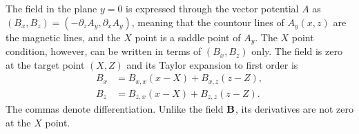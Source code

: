 \documentclass[10pt]{article}
\newcommand{\bfB}{{\bf B}}
\begin{document}
The field in the plane $y=0$ is expressed through the vector potential
$A$ as $(B_x, B_z) = (-\partial_zA_y, \partial_xA_y)$, meaning that
the countour lines of $A_y(x, z)$ are the magnetic lines, and the $X$
point is a saddle point of $A_y$.  The $X$ point condition, however,
can be written in terms of $(B_x,B_z)$ only.  The field is zero at the
target point $(X,Z)$ and its Taylor expansion to first order is
\begin{equation}
  \begin{aligned}
B_x &= B_{x,x}(x-X)+B_{x,z}(z-Z),\\
B_z &= B_{z,x}(x-X)+B_{z,z}(z-Z).
  \end{aligned}
  \label{linear}
\end{equation}
The commas denote differentiation.  Unlike the field $\bfB$, its
derivatives are not zero at the $X$ point.
\end{document}

